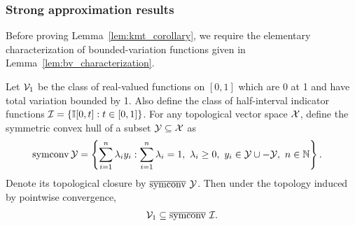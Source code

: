 \subsubsection{Strong approximation results}

Before proving Lemma~\ref{lem:kmt_corollary},
we require the elementary characterization
of bounded-variation functions given in
Lemma~\ref{lem:bv_characterization}.

\begin{lemma}
  \label{lem:bv_characterization}

  Let $\mathcal{V}_1$ be
  the class of real-valued functions on $[0,1]$
  which are 0 at 1 and have total variation bounded by 1.
  Also define the class of
  half-interval indicator functions $\mathcal{I} = \{\mathbb{I}[0,t]: t \in [0,1]\}$.
  For any topological vector space $\mathcal{X}$,
  define the symmetric convex hull of a subset $\mathcal{Y} \subseteq \mathcal{X}$
  as
  \begin{align*}
    \operatorname{symconv} \mathcal{Y}
    &=
    \left\{
    \sum_{i=1}^n
    \lambda_i
    y_i :
    \sum_{i=1}^n
    \lambda_i
    = 1, \
    \lambda_i
    \geq 0, \
    y_i \in \mathcal{Y} \cup -\mathcal{Y}, \
    n \in \mathbb{N}
    \right\}.
  \end{align*}
  Denote its topological closure by
  $\overline{\operatorname{symconv}} \ \mathcal{Y}$.
  Then under the topology induced
  by pointwise convergence,
  \begin{align*}
    \mathcal{V}_1 \subseteq \overline{\operatorname{symconv}} \ \mathcal{I}.
  \end{align*}

\end{lemma}

